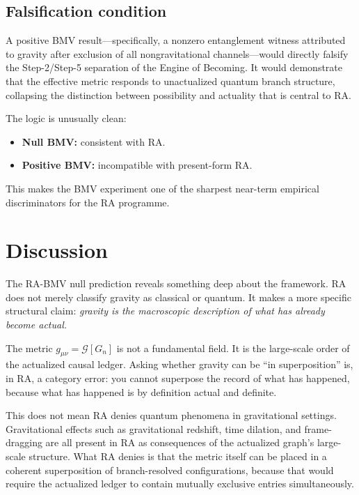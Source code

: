 \documentclass[12pt,a4paper]{article}
\begin{document}
\subsection{Falsification condition}

A positive BMV result---specifically, a nonzero entanglement witness
attributed to gravity after exclusion of all nongravitational
channels---would directly falsify the Step-2/Step-5 separation of
the Engine of Becoming. It would demonstrate that the effective
metric responds to unactualized quantum branch structure, collapsing
the distinction between possibility and actuality that is central
to RA.

The logic is unusually clean:
\begin{itemize}[nosep]
\item \textbf{Null BMV:} consistent with RA.
\item \textbf{Positive BMV:} incompatible with present-form RA.
\end{itemize}

This makes the BMV experiment one of the sharpest near-term
empirical discriminators for the RA programme.

\section{Discussion}
\label{sec:discussion}

The RA-BMV null prediction reveals something deep about the framework.
RA does not merely classify gravity as classical or quantum. It makes
a more specific structural claim: \emph{gravity is the macroscopic
description of what has already become actual.}

The metric $g_{\mu\nu} = \mathcal{G}[G_n]$ is not a fundamental
field. It is the large-scale order of the actualized causal ledger.
Asking whether gravity can be ``in superposition'' is, in RA, a
category error: you cannot superpose the record of what has happened,
because what has happened is by definition actual and definite.

This does not mean RA denies quantum phenomena in gravitational
settings. Gravitational effects such as gravitational redshift,
time dilation, and frame-dragging are all present in RA as
consequences of the actualized graph's large-scale structure. What
RA denies is that the metric itself can be placed in a coherent
superposition of branch-resolved configurations, because that would
require the actualized ledger to contain mutually exclusive entries
simultaneously.
\end{document}
